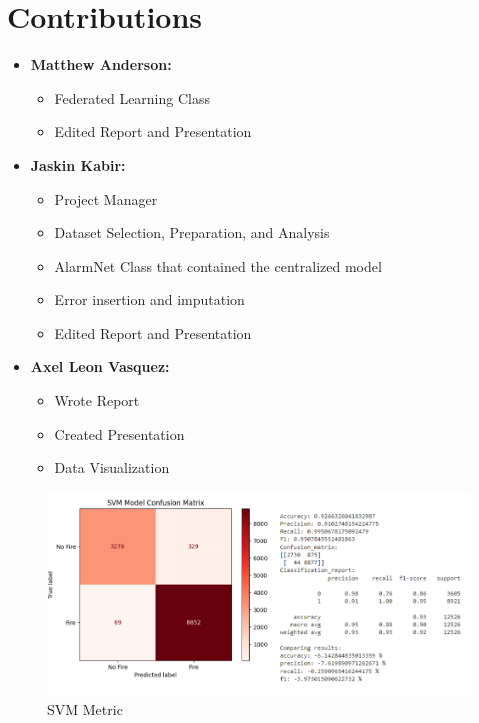 \documentclass[conference]{IEEEtran}
\begin{document}
\section{Contributions}
\begin{itemize}
\item\textbf{Matthew Anderson:} 
\begin{itemize}
    \item Federated Learning Class
    \item Edited Report and Presentation
\end{itemize}

\item\textbf{Jaskin Kabir:} 
\begin{itemize}
    \item Project Manager
    \item Dataset Selection, Preparation, and Analysis
    \item AlarmNet Class that contained the centralized
    model
    \item Error insertion and imputation
    \item Edited Report and Presentation
\end{itemize}

\item\textbf{Axel Leon Vasquez:} 
\begin{itemize}
    \item Wrote Report
    \item Created Presentation
    \item Data Visualization
\end{itemize}
\end{itemize}
\vfill\null



\newpage
{}

\begin{figure}[htbp]
    \centering
    \includegraphics[width=0.75\linewidth]{images/SVM.png}
    \caption{SVM Metric}
    \label{fig: SVM Model}
\end{figure}
\end{document}
